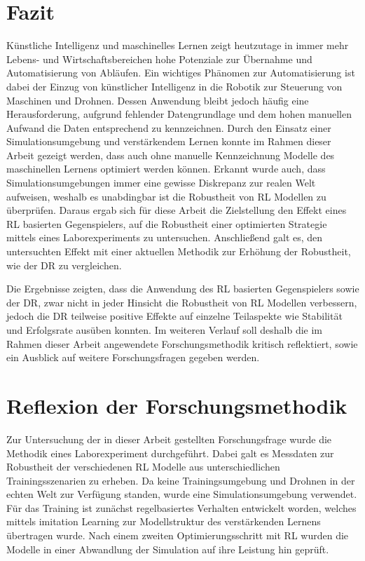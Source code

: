 \section{Fazit}
Künstliche Intelligenz und maschinelles Lernen zeigt heutzutage in immer mehr Lebens- und Wirtschaftsbereichen hohe Potenziale zur Übernahme und Automatisierung von Abläufen.
Ein wichtiges Phänomen zur Automatisierung ist dabei der Einzug von künstlicher Intelligenz in die Robotik zur Steuerung von Maschinen und Drohnen.
Dessen Anwendung bleibt jedoch häufig eine Herausforderung, aufgrund fehlender Datengrundlage und dem hohen manuellen Aufwand die Daten entsprechend zu kennzeichnen. 
Durch den Einsatz einer Simulationsumgebung und verstärkendem Lernen konnte im Rahmen dieser Arbeit gezeigt werden, dass auch ohne manuelle Kennzeichnung Modelle des maschinellen Lernens optimiert werden können.
Erkannt wurde auch, dass Simulationsumgebungen immer eine gewisse Diskrepanz zur realen Welt aufweisen, weshalb es unabdingbar ist die Robustheit von RL Modellen zu überprüfen.
Daraus ergab sich für diese Arbeit die Zielstellung den Effekt eines RL basierten Gegenspielers, auf die Robustheit einer optimierten Strategie mittels eines Laborexperiments zu untersuchen.
Anschließend galt es, den untersuchten Effekt mit einer aktuellen Methodik zur Erhöhung der Robustheit, wie der DR zu vergleichen.

Die Ergebnisse zeigten, dass die Anwendung des RL basierten Gegenspielers sowie der DR, zwar nicht in jeder Hinsicht die Robustheit von RL Modellen verbessern, jedoch die DR teilweise positive Effekte auf einzelne Teilaspekte wie Stabilität und Erfolgsrate ausüben konnten.
Im weiteren Verlauf soll deshalb die im Rahmen dieser Arbeit angewendete Forschungsmethodik kritisch reflektiert, sowie ein Ausblick auf weitere Forschungsfragen gegeben werden.

\section{Reflexion der Forschungsmethodik}

Zur Untersuchung der in dieser Arbeit gestellten Forschungsfrage wurde die Methodik eines Laborexperiment durchgeführt. 
Dabei galt es Messdaten zur Robustheit der verschiedenen RL Modelle aus unterschiedlichen Trainingsszenarien zu erheben.
Da keine Trainingsumgebung und Drohnen in der echten Welt zur Verfügung standen, wurde eine Simulationsumgebung verwendet. 
Für das Training ist zunächst regelbasiertes Verhalten entwickelt worden, welches mittels imitation Learning zur Modellstruktur des verstärkenden Lernens übertragen wurde.
Nach einem zweiten Optimierungsschritt mit RL wurden die Modelle in einer Abwandlung der Simulation auf ihre Leistung hin geprüft.

